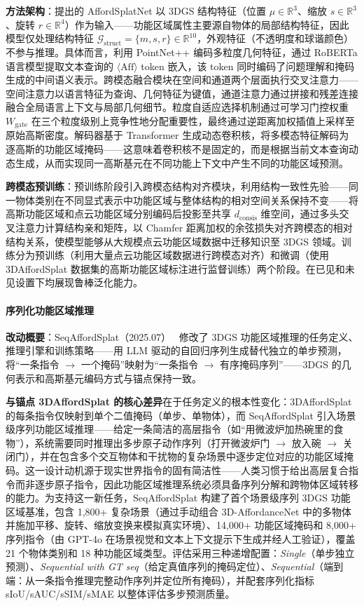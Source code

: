 \textbf{方法架构}：提出的 AffordSplatNet 以 3DGS 结构特征（位置 $\mu \in \mathbb{R}^3$、缩放 $s \in \mathbb{R}^3$、旋转 $r \in \mathbb{R}^4$）作为输入——功能区域属性主要源自物体的局部结构特征，因此模型仅处理结构特征 $\mathcal{G}_\text{struct} = \{m, s, r\} \in \mathbb{R}^{10}$，外观特征（不透明度和球谐颜色）不参与推理。具体而言，利用 PointNet++ 编码多粒度几何特征，通过 RoBERTa 语言模型提取文本查询的 $\langle\text{Aff}\rangle$ token 嵌入，该 token 同时编码了问题理解和掩码生成的中间语义表示。跨模态融合模块在空间和通道两个层面执行交叉注意力——空间注意力以语言特征为查询、几何特征为键值，通道注意力通过拼接和残差连接融合全局语言上下文与局部几何细节。粒度自适应选择机制通过可学习门控权重 $W_\text{gate}$ 在三个粒度级别上竞争性地分配重要性，最终通过逆距离加权插值上采样至原始高斯密度。解码器基于 Transformer 生成动态卷积核，将多模态特征解码为逐高斯的功能区域掩码——这意味着卷积核不是固定的，而是根据当前文本查询动态生成，从而实现同一高斯基元在不同功能上下文中产生不同的功能区域预测。

\textbf{跨模态预训练}：预训练阶段引入跨模态结构对齐模块，利用结构一致性先验——同一物体类别在不同显式表示中功能区域与整体结构的相对空间关系保持不变——将高斯功能区域和点云功能区域分别编码后投影至共享 $d_\text{consis}$ 维空间，通过多头交叉注意力计算结构亲和矩阵，以 Chamfer 距离加权的余弦损失对齐跨模态的相对结构关系，使模型能够从大规模点云功能区域数据中迁移知识至 3DGS 领域。训练分为预训练（利用大量点云功能区域数据进行跨模态对齐）和微调（使用 3DAffordSplat 数据集的高斯功能区域标注进行监督训练）两个阶段。在已见和未见设置下均展现鲁棒泛化能力。

\paragraph{序列化功能区域推理}

\textbf{改动概要}：SeqAffordSplat（2025.07）~\cite{2507_23772} 修改了 3DGS 功能区域推理的任务定义、推理引擎和训练策略——用 LLM 驱动的自回归序列生成替代独立的单步预测，将``一条指令 $\to$ 一个掩码''映射为``一条指令 $\to$ 有序掩码序列''——3DGS 的几何表示和高斯基元编码方式与锚点保持一致。

\textbf{与锚点 3DAffordSplat 的核心差异}在于任务定义的根本性变化：3DAffordSplat 的每条指令仅映射到单个二值掩码（单步、单物体），而 SeqAffordSplat 引入场景级序列功能区域推理——给定一条简洁的高层指令（如``用微波炉加热碗里的食物''），系统需要同时推理出多步原子动作序列（打开微波炉门 $\to$ 放入碗 $\to$ 关闭门），并在包含多个交互物体和干扰物的复杂场景中逐步定位对应的功能区域掩码。这一设计动机源于现实世界指令的固有简洁性——人类习惯于给出高层复合指令而非逐步原子指令，因此功能区域推理系统必须具备序列分解和跨物体区域转移的能力。为支持这一新任务，SeqAffordSplat 构建了首个场景级序列 3DGS 功能区域基准，包含 1,800+ 复杂场景（通过手动组合 3D-AffordanceNet 中的多物体并施加平移、旋转、缩放变换来模拟真实环境）、14,000+ 功能区域掩码和 8,000+ 序列指令（由 GPT-4o 在场景视觉和文本上下文提示下生成并经人工验证），覆盖 21 个物体类别和 18 种功能区域类型。评估采用三种递增配置：\textit{Single}（单步独立预测）、\textit{Sequential with GT seq}（给定真值序列的掩码定位）、\textit{Sequential}（端到端：从一条指令推理完整动作序列并定位所有掩码），并配套序列化指标 sIoU/sAUC/sSIM/sMAE 以整体评估多步预测质量。

